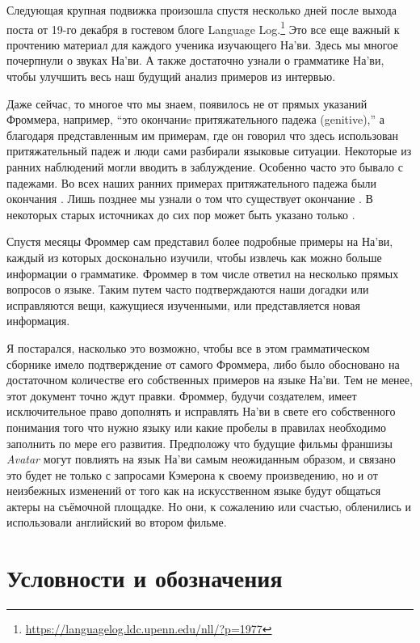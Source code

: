 Следующая крупная подвижка произошла спустя несколько дней после
выхода поста от 19-го декабря в гостевом блоге Language
Log.\footnote{\url{https://languagelog.ldc.upenn.edu/nll/?p=1977}}
Это все еще важный к прочтению материал для каждого ученика
изучающего На'ви. Здесь мы многое почерпнули о звуках На'ви. А
также
достаточно узнали о грамматике На’ви, чтобы улучшить весь наш
будущий анализ
примеров из интервью.

Даже сейчас, то многое что мы знаем, появилось не от прямых
указаний Фроммера, например, ``это окончаниe притяжательного
падежа (genitive),'' а благодаря представленным им примерам, где
он говорил что здесь использован притяжательный падеж и люди
сами разбирали языковые ситуации. Некоторые из ранних наблюдений
могли вводить в заблуждение. Особенно часто это бывало с
падежами. Во всех наших ранних примерах притяжательного падежа
были окончания . Лишь позднее мы узнали о том что
существует окончание . В некоторых старых источниках до
сих пор может быть указано только
.

Спустя месяцы Фроммер сам представил более подробные примеры на
На'ви, каждый из которых досконально изучили, чтобы извлечь как
можно больше информации о грамматике. Фроммер в том числе
ответил на несколько прямых вопросов о языке. Таким путем часто
подтверждаются наши догадки или исправляются вещи, кажущиеся
изученными, или представляется новая информация.

Я постарался, насколько это возможно, чтобы все в этом
грамматическом сборнике имело подтверждение от самого Фроммера,
либо было обосновано на достаточном количестве его собственных
примеров на языке На'ви. Тем не менее, этот документ точно ждут
правки. Фроммер, будучи создателем, имеет исключительное право
дополнять и исправлять На'ви в свете его собственного понимания
того что нужно языку или какие пробелы в правилах необходимо
заполнить по мере его развития.
Предположу что будущие фильмы франшизы \textit{Avatar} могут
повлиять на язык На'ви самым неожиданным образом, и связано это
будет не только с запросами Кэмерона к своему произведению, но и
от неизбежных изменений от того как на искусственном языке будут
общаться актеры на съёмочной площадке. Но они, к сожалению или
счастью, обленились и использовали английский во втором фильме.


\section{Условности и обозначения}

